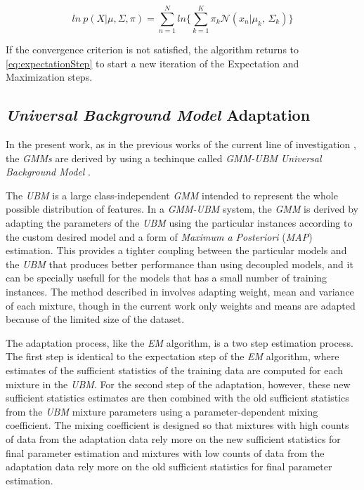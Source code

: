 \begin{equation}
	ln \ p(X|\mu, \Sigma, \pi) = \sum_{n=1}^{N}ln\Big\{\sum_{k=1}^{K}\pi_{k}\mathcal{N}(x_{n}|\mu_{k},\,\Sigma_{k})\Big\}
\end{equation}


If the convergence criterion is not satisfied, the algorithm returns to \ref{eq:expectationStep}
to start a new iteration of the Expectation and Maximization steps.

\subsection{\textit{Universal Background Model} Adaptation}

In the present work, as in the previous works of the current line of investigation
\cite{detection_phone_level_mispronunciation_learning, main}, the \textit{GMMs} are derived
by using a techinque called \textit{GMM-UBM} \textit{Universal Background Model} \cite{ubm_adaptation}.

The \textit{UBM} is a large class-independent \textit{GMM} intended to represent the whole possible
distribution of features. In a \textit{GMM-UBM} system, the
\textit{GMM} is derived by adapting the parameters of the \textit{UBM} using the particular
instances according to the custom desired model and a form of
\textit{Maximum a Posteriori} (\textit{MAP}) estimation. This provides a tighter coupling
between the particular models and the \textit{UBM} that produces better performance than
using decoupled models, and it can be specially usefull for the models that has a small number
of training instances. The method described in \cite{ubm_adaptation} involves adapting weight,
mean and variance of each mixture, though in the current work only weights and means are adapted
because of the limited size of the dataset.

The adaptation process, like the \textit{EM} algorithm, is a two step estimation process.
The first step is identical to the expectation step of the \textit{EM} algorithm, where estimates
of the sufficient statistics of the training data are computed for each mixture in the
\textit{UBM}. For the second step of the adaptation, however, these new sufficient statistics
estimates are then combined with the old sufficient statistics from the \textit{UBM}
mixture parameters using a parameter-dependent mixing coefficient. The
mixing coefficient is designed so that mixtures with high counts of data
from the adaptation data rely more on the new
sufficient statistics for final parameter estimation and mixtures with low counts of data
from the adaptation data rely more on the old sufficient statistics for final parameter
estimation.

